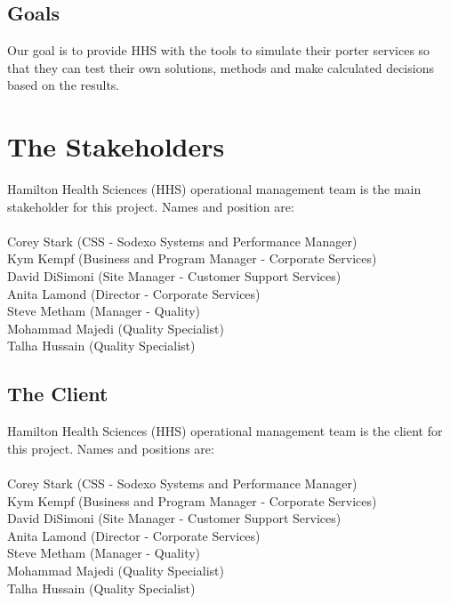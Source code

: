 \documentclass[paper=letter, fontsize=10pt]{scrartcl}
\numberwithin{equation}{section}		%
\numberwithin{figure}{section}			%
\numberwithin{table}{section}				%
\begin{document}
\subsection{Goals}
Our goal is to provide HHS with the tools to simulate their porter services so that they can test their own solutions, methods and make calculated decisions based on the results.

\section{The Stakeholders}
Hamilton Health Sciences (HHS) operational management team is the main stakeholder for this project. Names and position are:\\ \\
Corey Stark (CSS - Sodexo Systems and Performance Manager)\\
Kym Kempf (Business and Program Manager - Corporate Services)\\
David DiSimoni (Site Manager - Customer Support Services)\\
Anita Lamond (Director - Corporate Services)\\
Steve Metham (Manager - Quality)\\
Mohammad Majedi (Quality Specialist)\\
Talha Hussain (Quality Specialist)

\subsection{The Client}
Hamilton Health Sciences (HHS) operational management team is the client for this project. Names and positions are:\\ \\
Corey Stark (CSS - Sodexo Systems and Performance Manager)\\
Kym Kempf (Business and Program Manager - Corporate Services)\\
David DiSimoni (Site Manager - Customer Support Services)\\
Anita Lamond (Director - Corporate Services)\\
Steve Metham (Manager - Quality)\\
Mohammad Majedi (Quality Specialist)\\
Talha Hussain (Quality Specialist)
\end{document}
